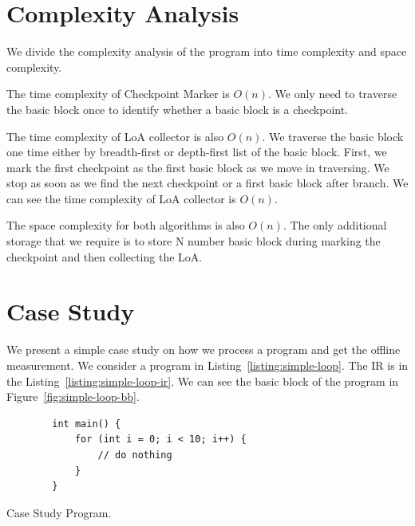 \section{Complexity Analysis}

We divide the complexity analysis of the program into time complexity and space
complexity. 

The time complexity of Checkpoint Marker is $O(n)$. We only need to traverse the
basic block once to identify whether a basic block is a checkpoint.

The time complexity of LoA collector is also $O(n)$. We traverse the basic block
one time either by breadth-first or depth-first list of the basic block. First,
we mark the first checkpoint as the first basic block as we move in traversing.
We stop as soon as we find the next checkpoint or a first basic block after
branch. We can see the time complexity of LoA collector is $O(n)$.

The space complexity for both algorithms is also $O(n)$. The only additional
storage that we require is to store N number basic block during marking the
checkpoint and then collecting the LoA.

\section{Case Study}

We present a simple case study on how we process a program and
get the offline measurement. We consider a program in
Listing~\ref{listing:simple-loop}. The IR is in the
Listing~\ref{listing:simple-loop-ir}. We can see the basic block of the program
in Figure~\ref{fig:simple-loop-bb}. 


\begin{listing}[h]
    \begin{verbatim}
        int main() {
            for (int i = 0; i < 10; i++) {
                // do nothing
            }
        }
    \end{verbatim}
    \caption{Case Study Program.}    
    \label{listing:simple-loop}
\end{listing}


